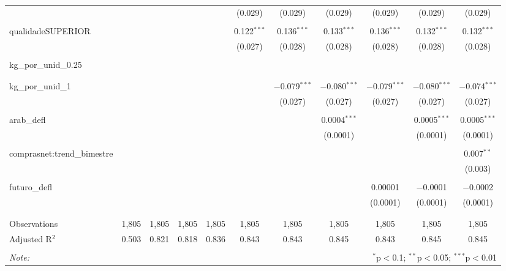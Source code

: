 \begin{table}[!htbp]
\begin{tabular}{@{\extracolsep{5pt}}lcccccccccc}
  &  &  &  &  & (0.029) & (0.029) & (0.029) & (0.029) & (0.029) & (0.029) \\ 
  & & & & & & & & & & \\ 
 qualidadeSUPERIOR &  &  &  &  & 0.122$^{***}$ & 0.136$^{***}$ & 0.133$^{***}$ & 0.136$^{***}$ & 0.132$^{***}$ & 0.132$^{***}$ \\ 
  &  &  &  &  & (0.027) & (0.028) & (0.028) & (0.028) & (0.028) & (0.028) \\ 
  & & & & & & & & & & \\ 
 kg\_por\_unid\_0.25 &  &  &  &  &  &  &  &  &  &  \\ 
  &  &  &  &  &  &  &  &  &  &  \\ 
  & & & & & & & & & & \\ 
 kg\_por\_unid\_1 &  &  &  &  &  & $-$0.079$^{***}$ & $-$0.080$^{***}$ & $-$0.079$^{***}$ & $-$0.080$^{***}$ & $-$0.074$^{***}$ \\ 
  &  &  &  &  &  & (0.027) & (0.027) & (0.027) & (0.027) & (0.027) \\ 
  & & & & & & & & & & \\ 
 arab\_defl &  &  &  &  &  &  & 0.0004$^{***}$ &  & 0.0005$^{***}$ & 0.0005$^{***}$ \\ 
  &  &  &  &  &  &  & (0.0001) &  & (0.0001) & (0.0001) \\ 
  & & & & & & & & & & \\ 
 comprasnet:trend\_bimestre &  &  &  &  &  &  &  &  &  & 0.007$^{**}$ \\ 
  &  &  &  &  &  &  &  &  &  & (0.003) \\ 
  & & & & & & & & & & \\ 
 futuro\_defl &  &  &  &  &  &  &  & 0.00001 & $-$0.0001 & $-$0.0002 \\ 
  &  &  &  &  &  &  &  & (0.0001) & (0.0001) & (0.0001) \\ 
  & & & & & & & & & & \\ 
\hline \\[-1.8ex] 
Observations & 1,805 & 1,805 & 1,805 & 1,805 & 1,805 & 1,805 & 1,805 & 1,805 & 1,805 & 1,805 \\ 
Adjusted R$^{2}$ & 0.503 & 0.821 & 0.818 & 0.836 & 0.843 & 0.843 & 0.845 & 0.843 & 0.845 & 0.845 \\ 
\hline 
\hline \\[-1.8ex] 
\textit{Note:}  & \multicolumn{10}{r}{$^{*}$p$<$0.1; $^{**}$p$<$0.05; $^{***}$p$<$0.01} \\ 
\end{tabular} 
\end{table} 

